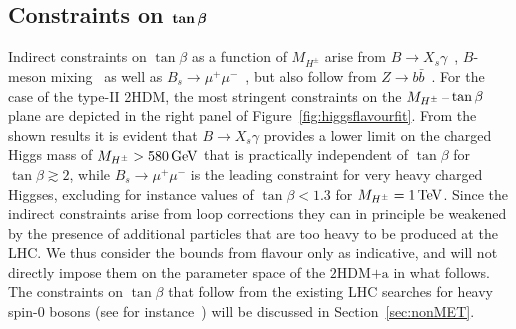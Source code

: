 \documentclass[a4paper, 11pt,notoc]{article}
\newcommand{\hdma}{\ensuremath{\textrm{2HDM+a}}\xspace}
\def\bm#1{\mbox{\boldmath$#1$\unboldmath}}
\begin{document}
\subsection*{Constraints on $\bm{\tan \beta}$}

Indirect constraints on $\tan \beta$ as a function of $M_{H^\pm}$ arise from $B \to X_s \gamma$~\cite{Hermann:2012fc,Misiak:2015xwa,Misiak:2017bgg}, $B$-meson mixing~\cite{Abbott:1979dt,Geng:1988bq,Buras:1989ui,Kirk:2017juj} as well as  $B_s \to \mu^+ \mu^-$~\cite{Skiba:1992mg,Logan:2000iv,Chankowski:2000ng,Bobeth:2001sq,Bobeth:2013uxa,CMS:2014xfa,Aaij:2017vad}, but also follow from $Z \to b \bar b$~\cite{Denner:1991ie,Haisch:2007ia,Freitas:2012sy}. For the case of the type-II 2HDM, the most stringent constraints on the $M_{H^{\pm}}\hspace{0.5mm}$--$\hspace{0.5mm}\tan \beta$ plane are depicted in the right panel of Figure~\ref{fig:higgsflavourfit}. From the shown results it is evident that $B \to X_s \gamma$ provides a lower limit on the charged Higgs mass of $M_{H^\pm} > 580 \, {\rm GeV}$ that is practically independent of $\tan \beta$ for $\tan \beta \gtrsim 2$, while $B_s \to \mu^+ \mu^-$ is the leading constraint for very heavy charged Higgses, excluding for instance values of $\tan \beta < 1.3$ for $M_{H^\pm} = 1 \, {\rm TeV}$.  Since the  indirect constraints   arise from loop corrections they can in principle be weakened by the presence of additional particles that are too heavy to be produced at the LHC. We thus consider the bounds from flavour only as indicative, and will not directly impose them on the parameter space of the \hdma in what follows. The constraints on $\tan \beta$ that follow from the existing LHC searches for heavy spin-0 bosons (see for instance~\cite{Aaboud:2017sjh,Sirunyan:2018zut,Aaboud:2017hnm,ATLAS-CONF-2016-104,Sirunyan:2017roi,Aaboud:2018xuw}) will be discussed in Section~\ref{sec:nonMET}.
\end{document}
